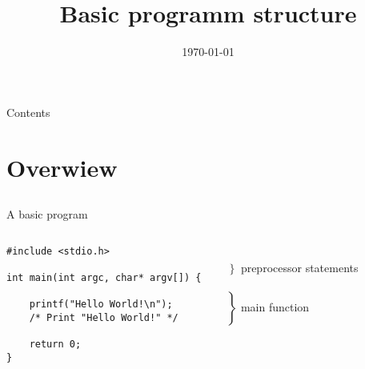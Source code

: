 
\usepackage{ulem}

\newcommand{\topic}{
	Basic programm structure
}

\title{\topic}
\supertitle{\course}
\date{\today}



\maketitle

\begin{frame}{Contents}
	\tableofcontents
\end{frame}

\section{Overwiew}
\subsection{}
\begin{frame}[fragile]{A basic program}
	\begin{columns}[T]
		\begin{lstlisting}
#include <stdio.h>

int main(int argc, char* argv[]) {

	printf("Hello World!\n");
	/* Print "Hello World!" */

	return 0;
}
\end{lstlisting}
		
		\ \\$\left. \begin{array}{c}\\\end{array}\right\rbrace $ preprocessor statements
		\ \\\ \\$\left. \begin{array}{c}\\\\\\\\\\\end{array}\right\rbrace $ main function
	\end{columns}
\end{frame}
